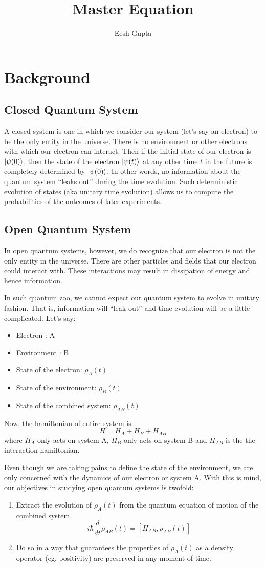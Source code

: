 \documentclass{article}
\title{Master Equation}
\author{Eesh Gupta}
\newcommand{\s}{\item[]}
\begin{document}
\maketitle

\section{Background}
\subsection{Closed Quantum System}
A closed system is one in which we consider our system (let's say
an electron) to be the only
entity in the universe. There is no environment or other electrons with which our electron can interact. Then if the initial state of
our electron is \(\ket{\psi(0)}\), then the state of the electron \(\ket{\psi(t)}\)
at any other time \(t\) in the future is completely determined by \(\ket{\psi(0)}\).
In other words, no information about the quantum system ``leaks out'' during
the time evolution. Such deterministic evolution of states (aka unitary time
evolution) allows us to compute
the probabilities of the outcomes of later experiments.
\subsection{Open Quantum System}
In open quantum systems, however, we do recognize that our electron is not the only
entity in the universe. There are other particles and fields that our electron
could interact with. These interactions may result in dissipation of energy and
hence information.

In such quantum zoo, we cannot expect our quantum system to evolve in unitary
fashion. That is, information will ``leak out'' and time evolution will be
a little complicated. Let's say:
\begin{itemize}
  \s Electron : A
  \s Environment : B
  \s State of the electron: \(\rho_A(t)\)
  \s State of the environment: \(\rho_B(t)\)
  \s State of the combined system: \(\rho_{AB}(t)\)
\end{itemize}
Now, the hamiltonian of entire system is
\[H = H_A + H_B + H_{AB}\]
where \(H_A\) only acts on system A, \(H_B\) only acts on system B and \(H_{AB}\) is the
the interaction hamiltonian.

Even though we are taking pains to define the state of the environment, we are
only concerned with the dynamics of our electron or system A.
With this is mind, our objectives in studying open quantum systems is twofold:
\begin{enumerate}
  \item Extract the evolution of \(\rho_A(t)\) from the quantum equation of
  motion of the combined system.
  \[ i\hbar \frac{d }{d t} \rho_{AB}(t) = [H_{AB}, \rho_{AB}(t)]\]
  \item Do so in a way that guarantees the properties of  \(\rho_A(t)\) as
  a density operator (eg. positivity) are preserved in any moment of time.
\end{enumerate}
\end{document}
